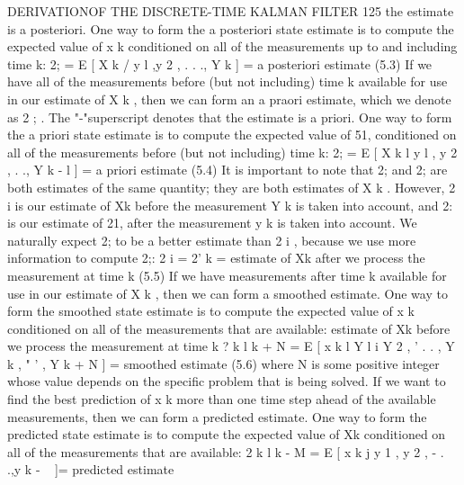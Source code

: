 DERIVATIONOF THE DISCRETE-TIME KALMAN FILTER 125
the estimate is a posteriori. One way to form the a posteriori state estimate is to
compute the expected value of x k conditioned on all of the measurements up to
and including time k:
2; = E [ X k / y l ,y 2 , . . ., Y k ] = a posteriori estimate (5.3)
If we have all of the measurements before (but not including) time k available for
use in our estimate of X k , then we can form an a praori estimate, which we denote
as 2 ; . The "-"superscript denotes that the estimate is a priori. One way to form
the a priori state estimate is to compute the expected value of 51, conditioned on
all of the measurements before (but not including) time k:
2; = E [ X k l y l , y 2 , . ., Y k - l ] = a priori estimate (5.4)
It is important to note that 2; and 2; are both estimates of the same quantity; they
are both estimates of X k . However, 2 i is our estimate of Xk before the measurement
Y k is taken into account, and 2: is our estimate of 21, after the measurement y k
is taken into account. We naturally expect 2; to be a better estimate than 2 i ,
because we use more information to compute 2;:
2 i =
2' k = estimate of Xk after we process the measurement at time k (5.5)
If we have measurements after time k available for use in our estimate of X k , then
we can form a smoothed estimate. One way to form the smoothed state estimate is
to compute the expected value of x k conditioned on all of the measurements that
are available:
estimate of Xk before we process the measurement at time k
? k l k + N = E [ x k l Y l i Y 2 , ' . . , Y k , " ' , Y k + N ] = smoothed estimate (5.6)
where N is some positive integer whose value depends on the specific problem that
is being solved. If we want to find the best prediction of x k more than one time
step ahead of the available measurements, then we can form a predicted estimate.
One way to form the predicted state estimate is to compute the expected value of
Xk conditioned on all of the measurements that are available:
2 k l k - M = E [ x k j y 1 , y 2 , - . .,y k - ~ ]= predicted estimate 